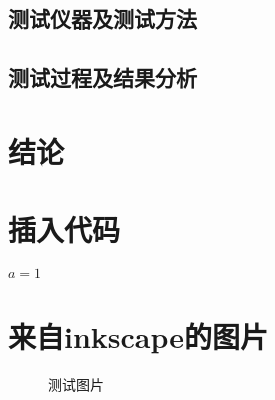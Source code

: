 \documentclass[pdfCover]{contestTemplate} %
\begin{document}
	\subsection{测试仪器及测试方法}

	\subsection{测试过程及结果分析}

\section{结论}


\section*{插入代码}
\begin{codebox}
  \li $a = 1$

\end{codebox}

\section*{来自inkscape的图片}
	\begin{figure}[H]
		\centering
		\def\svgwidth{0.6\linewidth}
		
		\caption{测试图片}
		\label{fig:_test}
	\end{figure}



\nocite{*}
\end{document}
